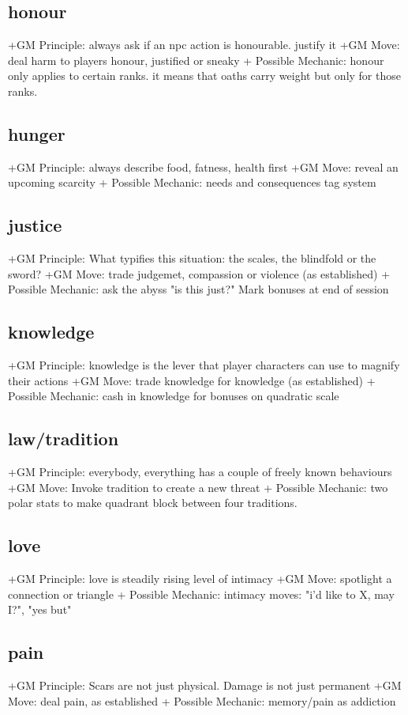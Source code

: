 \documentclass{tufte-handout}
\begin{document}
\subsection{honour}
+GM Principle: always ask if an npc action is honourable. justify it
+GM Move: deal harm to players honour, justified or sneaky
+ Possible Mechanic: honour only applies to certain ranks. it means that oaths carry weight but only for those ranks.

\subsection{hunger}
+GM Principle:  always describe food, fatness, health first
+GM Move:   reveal an upcoming scarcity
+ Possible Mechanic: needs and consequences tag system

\subsection{justice}
+GM Principle: What typifies this situation: the scales, the blindfold or the sword?	
+GM Move: trade judgemet, compassion or violence (as established)
+ Possible Mechanic: ask the abyss "is this just?" Mark bonuses at end of session 

\subsection{knowledge }
+GM Principle: knowledge is the lever that player characters can use to magnify their actions	
+GM Move: trade knowledge for knowledge (as established)
+ Possible Mechanic: cash in knowledge for bonuses on quadratic scale

\subsection{law/tradition}
+GM Principle: everybody, everything has a couple of freely known behaviours
+GM Move: Invoke tradition to create a new threat
+ Possible Mechanic: two polar stats to make quadrant block between four traditions. 

\subsection{love}
+GM Principle:  love is steadily rising level of intimacy
+GM Move: spotlight a connection or triangle
+ Possible Mechanic: intimacy moves: 	 "i'd like to X, may I?", "yes but"

\subsection{pain}
+GM Principle: Scars are not just physical. Damage is not just permanent
+GM Move: deal pain, as established
+ Possible Mechanic: memory/pain as addiction 
\end{document}
